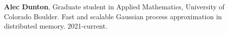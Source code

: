 \begin{innerlist}

\item[] \textbf{Alec Dunton},
      Graduate student in Applied Mathematics,
      University of Colorado Boulder.
      Fast and scalable Gaussian process approximation in distributed memory.
      2021-current.

\end{innerlist}
